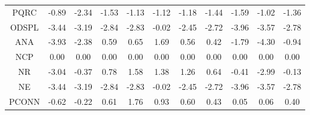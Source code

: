 \documentclass[11pt,a4paper]{report}
\begin{document}
\begin{centering}
\begin{adjustwidth}{-2in}{-1in}
\begin{longtable}{ | c || c | c | c | c | c | c | c | c | c || c |}
PQRC &  \cellcolor[HTML]{FFE7E7} -0.89 &  \cellcolor[HTML]{FFC7C7} -2.34 &  \cellcolor[HTML]{FFD7D7} -1.53 &  \cellcolor[HTML]{FFDFDF} -1.13 &  \cellcolor[HTML]{FFDFDF} -1.12 &  \cellcolor[HTML]{FFDFDF} -1.18 &  \cellcolor[HTML]{FFD7D7} -1.44 &  \cellcolor[HTML]{FFD7D7} -1.59 &  \cellcolor[HTML]{FFE7E7} -1.02 &  \cellcolor[HTML]{FFDFDF} -1.36 \\
ODSPL &  \cellcolor[HTML]{FFA7A7} -3.44 &  \cellcolor[HTML]{FFAFAF} -3.19 &  \cellcolor[HTML]{FFB7B7} -2.84 &  \cellcolor[HTML]{FFB7B7} -2.83 &  \cellcolor[HTML]{FFFFFF} -0.02 &  \cellcolor[HTML]{FFBFBF} -2.45 &  \cellcolor[HTML]{FFB7B7} -2.72 &  \cellcolor[HTML]{FF9F9F} -3.96 &  \cellcolor[HTML]{FFA7A7} -3.57 &  \cellcolor[HTML]{FFB7B7} -2.78 \\
ANA &  \cellcolor[HTML]{FF9F9F} -3.93 &  \cellcolor[HTML]{FFC7C7} -2.38 &  \cellcolor[HTML]{EFEFFF} 0.59 &  \cellcolor[HTML]{EFEFFF} 0.65 &  \cellcolor[HTML]{D7D7FF} 1.69 &  \cellcolor[HTML]{EFEFFF} 0.56 &  \cellcolor[HTML]{F7F7FF} 0.42 &  \cellcolor[HTML]{FFCFCF} -1.79 &  \cellcolor[HTML]{FF8F8F} -4.30 &  \cellcolor[HTML]{FFE7E7} -0.94 \\
NCP &  \cellcolor[HTML]{FFFFFF} 0.00 &  \cellcolor[HTML]{FFFFFF} 0.00 &  \cellcolor[HTML]{FFFFFF} 0.00 &  \cellcolor[HTML]{FFFFFF} 0.00 &  \cellcolor[HTML]{FFFFFF} 0.00 &  \cellcolor[HTML]{FFFFFF} 0.00 &  \cellcolor[HTML]{FFFFFF} 0.00 &  \cellcolor[HTML]{FFFFFF} 0.00 &  \cellcolor[HTML]{FFFFFF} 0.00 &  \cellcolor[HTML]{FFFFFF} 0.00 \\
NR &  \cellcolor[HTML]{FFAFAF} -3.04 &  \cellcolor[HTML]{FFF7F7} -0.37 &  \cellcolor[HTML]{EFEFFF} 0.78 &  \cellcolor[HTML]{D7D7FF} 1.58 &  \cellcolor[HTML]{DFDFFF} 1.38 &  \cellcolor[HTML]{DFDFFF} 1.26 &  \cellcolor[HTML]{EFEFFF} 0.64 &  \cellcolor[HTML]{FFF7F7} -0.41 &  \cellcolor[HTML]{FFB7B7} -2.99 &  \cellcolor[HTML]{FFFFFF} -0.13 \\
NE &  \cellcolor[HTML]{FFA7A7} -3.44 &  \cellcolor[HTML]{FFAFAF} -3.19 &  \cellcolor[HTML]{FFB7B7} -2.84 &  \cellcolor[HTML]{FFB7B7} -2.83 &  \cellcolor[HTML]{FFFFFF} -0.02 &  \cellcolor[HTML]{FFBFBF} -2.45 &  \cellcolor[HTML]{FFB7B7} -2.72 &  \cellcolor[HTML]{FF9F9F} -3.96 &  \cellcolor[HTML]{FFA7A7} -3.57 &  \cellcolor[HTML]{FFB7B7} -2.78 \\
PCONN &  \cellcolor[HTML]{FFEFEF} -0.62 &  \cellcolor[HTML]{FFF7F7} -0.22 &  \cellcolor[HTML]{EFEFFF} 0.61 &  \cellcolor[HTML]{CFCFFF} 1.76 &  \cellcolor[HTML]{E7E7FF} 0.93 &  \cellcolor[HTML]{EFEFFF} 0.60 &  \cellcolor[HTML]{F7F7FF} 0.43 &  \cellcolor[HTML]{FFFFFF} 0.05 &  \cellcolor[HTML]{FFFFFF} 0.06 &  \cellcolor[HTML]{F7F7FF} 0.40 \\

\end{longtable}
\end{adjustwidth}
\end{centering}
\end{document}
